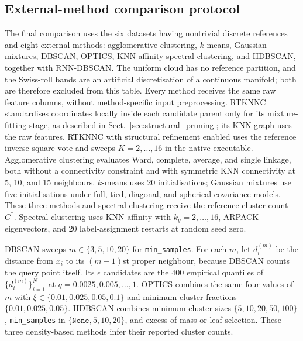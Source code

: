 \documentclass[review,12pt]{elsarticle}
\begin{document}
\subsection{External-method comparison protocol}\label{sec:external_comparison_protocol}

The final comparison uses the six datasets having nontrivial discrete
references and eight external methods: agglomerative clustering, $k$-means,
Gaussian mixtures, DBSCAN, OPTICS, KNN-affinity spectral clustering, and
HDBSCAN, together with RNN-DBSCAN. The uniform cloud has no reference partition, and the Swiss-roll
bands are an artificial discretisation of a continuous manifold; both are
therefore excluded from this table.  Every method receives the same raw feature columns, without
method-specific input preprocessing. RTKNNC standardises coordinates locally
inside each candidate parent only for its mixture-fitting stage, as described
in Sect.~\ref{sec:structural_pruning}; its KNN graph uses the raw features.
RTKNNC with structural refinement enabled uses the reference inverse-square vote and sweeps
$K=2,\ldots,16$ in the native executable.  Agglomerative clustering evaluates
Ward, complete, average, and single linkage, both without a connectivity
constraint and with symmetric KNN connectivity at 5, 10, and 15 neighbours.
$k$-means uses 20 initialisations; Gaussian mixtures use five initialisations
under full, tied, diagonal, and spherical covariance models.  These three
methods and spectral clustering receive the reference cluster count $C^*$.
Spectral clustering uses KNN affinity with $k_g=2,\ldots,16$, ARPACK
eigenvectors, and 20 label-assignment restarts at random seed zero.

DBSCAN sweeps $m\in\{3,5,10,20\}$ for \texttt{min\_samples}.  For each $m$,
let $d_i^{(m)}$ be the distance from $x_i$ to its $(m-1)$st proper neighbour,
because DBSCAN counts the query point itself.  Its $\epsilon$ candidates are
the 400 empirical quantiles of $\{d_i^{(m)}\}_{i=1}^N$ at
$q=0.0025,0.005,\ldots,1$.  OPTICS combines the same four values of $m$ with
$\xi\in\{0.01,0.025,0.05,0.1\}$ and minimum-cluster fractions
$\{0.01,0.025,0.05\}$.  HDBSCAN combines minimum cluster sizes
$\{5,10,20,50,100\}$, \texttt{min\_samples} in
$\{\texttt{None},5,10,20\}$, and excess-of-mass or leaf selection.  These
three density-based methods infer their reported cluster counts.
\end{document}
